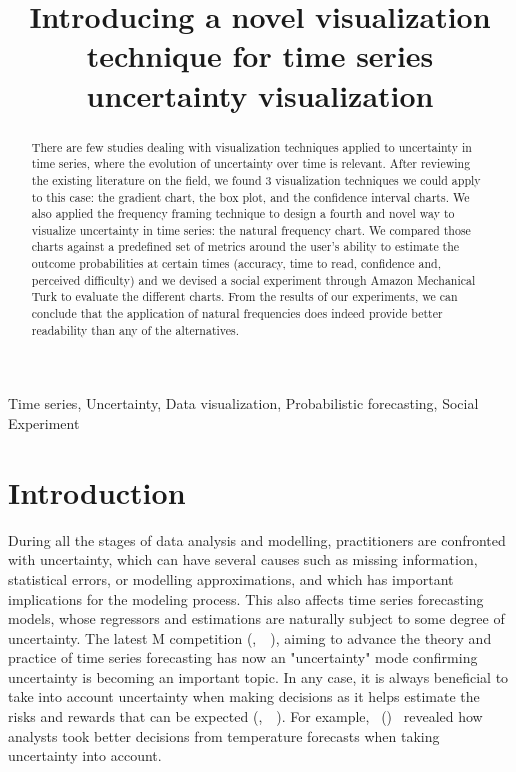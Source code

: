 \documentclass[a4paper,3p,sort&compress]{elsarticle}
\DeclareRobustCommand{\citeext}[1]{\citeauthor{#1},~\citeyear{#1}~\cite{#1}}
\DeclareRobustCommand{\citeextp}[1]{\citeauthor{#1}~(\citeyear{#1})~\cite{#1}}
\begin{document}
\linenumbers

\newcommand{\no}{NO\textsubscript{2}\xspace}
\newcommand{\ts}{\textsuperscript}

\begin{frontmatter}

  \title{Introducing a novel visualization technique for time series uncertainty visualization} 

  \begin{abstract}

    There are few studies dealing with visualization techniques applied to uncertainty in time series, 
    where the evolution of uncertainty over time is relevant. After reviewing the existing
    literature on the field, we found 3 visualization techniques we could apply to
    this case: the gradient chart, the box plot, and the confidence interval charts.
    We also applied the frequency framing technique to design a fourth and novel way 
    to visualize uncertainty in time series: the natural frequency chart. We compared those charts 
    against a predefined set of metrics around the user's ability to estimate the outcome 
    probabilities at certain times (accuracy, time to read, confidence and, perceived difficulty) 
    and we devised a social experiment through Amazon Mechanical Turk to evaluate the different charts. 
    From the results of our experiments, we can conclude that the application of natural 
    frequencies does indeed provide better readability than any of the alternatives.
    
    \end{abstract}

\begin{keyword}
Time series, Uncertainty, Data visualization, Probabilistic forecasting, Social Experiment
\end{keyword}

\end{frontmatter}


\section{Introduction} 
\label{sec:intro}

During all the stages of data analysis and modelling, practitioners are
confronted with uncertainty, which can have several causes such as missing
information, statistical errors, or modelling approximations, and which has
important implications for the modeling process. This also affects time series
forecasting models, whose regressors and estimations are naturally subject to
some degree of uncertainty. The latest M competition (\citeext{makridakis_m5_2022}), 
aiming to advance the 
theory and practice of time series forecasting has now an "uncertainty" 
mode confirming uncertainty is becoming an important topic. In any case, 
it is always beneficial to take into
account uncertainty when making decisions as it helps estimate the risks and
rewards that can be expected (\citeext{padilla_uncertainty_2021}).
For example, \citeextp{roulston_laboratory_2006} revealed how
analysts took better decisions from temperature forecasts when taking
uncertainty into account. 
\end{document}

